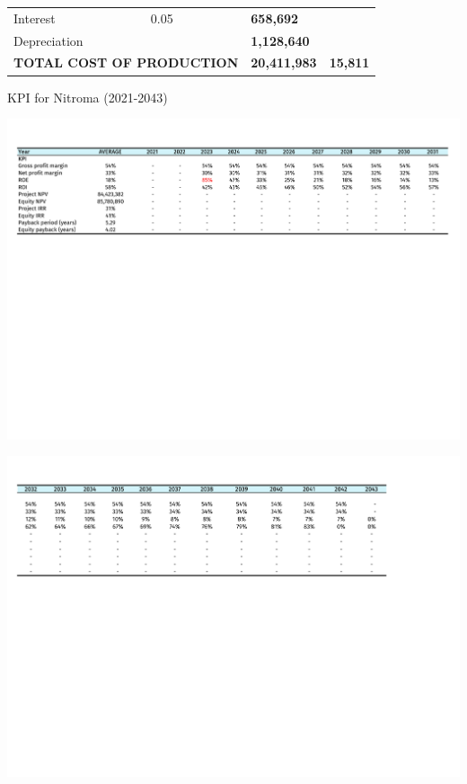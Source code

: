\begin{table}[H]
\begin{tabular}{@{}llllll@{}}
Interest                      & 0.05                  &                                       &                           & \textbf{658,692}           &                      \\
Depreciation                  &                       &                                       &                           & \textbf{1,128,640}         &                      \\ \cline{5-6} 
\multicolumn{4}{l}{\textbf{TOTAL COST OF PRODUCTION}}                                                                     & \textbf{20,411,983}        & \textbf{15,811}     
\end{tabular}
\end{table}

\begin{landscape}

\begin{table}
\label{tab:KPI}
  \caption{KPI for Nitroma (2021-2043)}
\includegraphics[clip, trim=1cm 5cm 1cm 1cm, width=\linewidth]{chapters/Z-support/attachments/KPI1.pdf}
\end{table}

\begin{table}
\includegraphics[clip, trim=0cm 5cm 1cm 1cm, width=\linewidth]{chapters/Z-support/attachments/KPI2.pdf}
\end{table}

\end{landscape}

